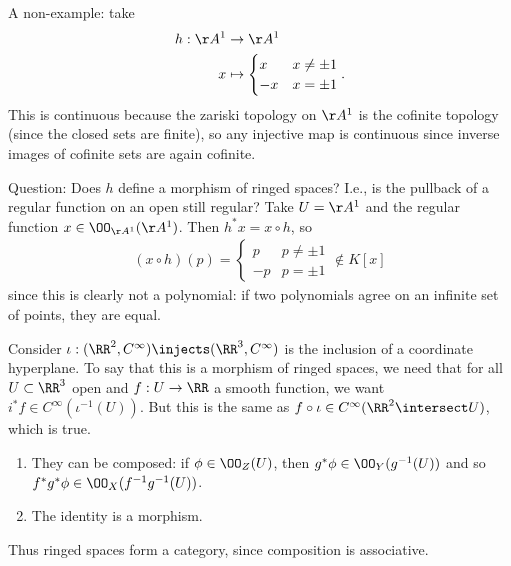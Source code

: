 \begin{example}

A non-example: take
\begin{align*}  
h: \AA^1 &\to \AA^1 \\
x & \mapsto 
\begin{cases}
x & x \neq \pm 1 \\
-x & x= \pm 1
\end{cases}
.\end{align*} This is continuous because the zariski topology on
\(\AA^1\) is the cofinite topology (since the closed sets are finite),
so any injective map is continuous since inverse images of cofinite sets
are again cofinite.

Question: Does \(h\) define a morphism of ringed spaces? I.e., is the
pullback of a regular function on an open still regular? Take
\(U = \AA^1\) and the regular function \(x\in \OO_{\AA^1}(\AA^1)\). Then
\(h^*x = x\circ h\), so
\begin{align*}  
(x\circ h)(p) =
\begin{cases}
p & p\neq \pm 1 \\
-p & p= \pm 1 
\end{cases}
\not \in K[x]
\end{align*} since this is clearly not a polynomial: if two polynomials
agree on an infinite set of points, they are equal.

\end{example}

\begin{example}

Consider \(\iota: (\RR^2, C^\infty) \injects (\RR^3, C^\infty)\) is the
inclusion of a coordinate hyperplane. To say that this is a morphism of
ringed spaces, we need that for all \(U\subset \RR^3\) open and
\(f:U\to \RR\) a smooth function, we want
\(i^* f\in C^\infty (\iota^{-1}(U))\). But this is the same as
\(f\circ \iota \in C^\infty(\RR^2\intersect U)\), which is true.

\end{example}

\begin{proposition}

\hfill

\begin{enumerate}
\def\labelenumi{\arabic{enumi}.}
\item
  They can be composed: if \(\phi \in \OO_Z(U)\), then
  \(g^* \phi \in \OO_Y(g^{-1}(U))\) and so
  \(f^* g^* \phi \in \OO_X(f^{-1} g^{-1} (U))\).
\item
  The identity is a morphism.
\end{enumerate}

Thus ringed spaces form a category, since composition is associative.

\end{proposition}

